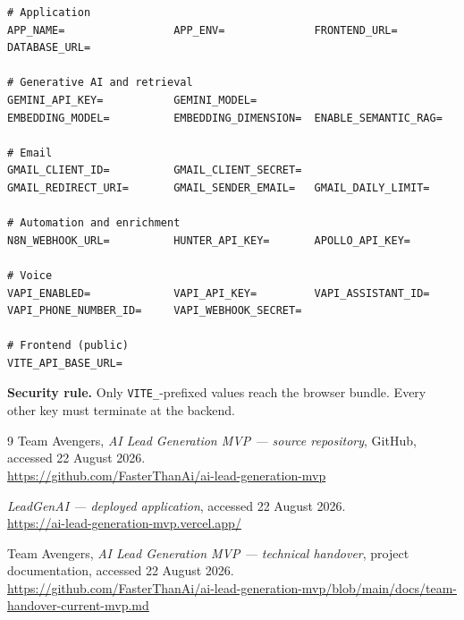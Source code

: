 \documentclass[11pt,a4paper]{report}
\begin{document}
\begin{lstlisting}[style=envstyle,caption={Backend and frontend configuration keys}]
# Application
APP_NAME=                 APP_ENV=              FRONTEND_URL=
DATABASE_URL=

# Generative AI and retrieval
GEMINI_API_KEY=           GEMINI_MODEL=
EMBEDDING_MODEL=          EMBEDDING_DIMENSION=  ENABLE_SEMANTIC_RAG=

# Email
GMAIL_CLIENT_ID=          GMAIL_CLIENT_SECRET=
GMAIL_REDIRECT_URI=       GMAIL_SENDER_EMAIL=   GMAIL_DAILY_LIMIT=

# Automation and enrichment
N8N_WEBHOOK_URL=          HUNTER_API_KEY=       APOLLO_API_KEY=

# Voice
VAPI_ENABLED=             VAPI_API_KEY=         VAPI_ASSISTANT_ID=
VAPI_PHONE_NUMBER_ID=     VAPI_WEBHOOK_SECRET=

# Frontend (public)
VITE_API_BASE_URL=
\end{lstlisting}

\textbf{Security rule.} Only \texttt{VITE\_}-prefixed values reach the browser bundle. Every other key must terminate at the backend.

\begin{thebibliography}{9}
Team Avengers, \emph{AI Lead Generation MVP --- source repository}, GitHub, accessed 22 August 2026.\\
\url{https://github.com/FasterThanAi/ai-lead-generation-mvp}

\emph{LeadGenAI --- deployed application}, accessed 22 August 2026.\\
\url{https://ai-lead-generation-mvp.vercel.app/}

Team Avengers, \emph{AI Lead Generation MVP --- technical handover}, project documentation, accessed 22 August 2026.\\
\url{https://github.com/FasterThanAi/ai-lead-generation-mvp/blob/main/docs/team-handover-current-mvp.md}
\end{thebibliography}
\end{document}
